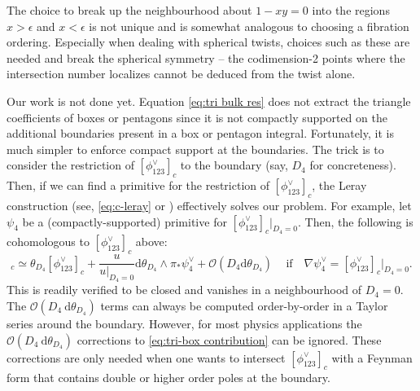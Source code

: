 \documentclass[11pt]{article}
\renewcommand{\d}{\text{d}}
\newcommand{\be}{\begin{equation}}
\newcommand{\ee}{\end{equation}}
\renewcommand{\O}{\mathcal{O}}
\begin{document}
The choice to break up the neighbourhood about $1-xy = 0$ into the regions $x>\epsilon$ and $x<\epsilon$ is not unique and is somewhat analogous to choosing a fibration ordering. Especially when dealing with spherical twists, choices such as these are needed and break the spherical symmetry -- the codimension-2 points where the intersection number localizes cannot be deduced from the twist alone.

Our work is not done yet. Equation \eqref{eq:tri bulk res} does not extract the triangle coefficients of boxes or pentagons since it is not compactly supported on the additional boundaries present in a box or pentagon integral.
Fortunately, it is much simpler to enforce compact support at the boundaries. The trick is to consider the restriction of $[\phi^\vee_{123}]_c$ to the boundary (say, $D_4$ for concreteness). 
Then, if we can find a primitive for the restriction of $[\phi^\vee_{123}]_c$, the Leray construction (see, \eqref{eq:c-leray} or \cite{Caron-Huot:2021xqj}) effectively solves our problem. For example, let $\psi_4$ be a (compactly-supported) primitive for $[\phi^\vee_{123}]_c\vert_{D_4=0}$.
Then, the following is cohomologous to $[\phi^\vee_{123}]_c$ above:
\be
	[\phi^\vee_{123}]_c 
	\simeq \theta_{D_4}[\phi^\vee_{123}]_c + \frac{u}{u\vert_{D_4=0}}
 	\d\theta_{D_4} \wedge \pi_*\psi_4^\vee + \O(D_4 \d\theta_{D_4})\,
 	\quad\mbox{if}\quad 
 	\nabla \psi_4^\vee = [\phi^\vee_{123}]_c\vert_{D_4=0}.
\label{eq:tri-box contribution}
\ee
This is readily verified to be closed and vanishes in a neighbourhood of $D_4=0$.
The $\O(D_4\ \d\theta_{D_4})$ terms can always be computed order-by-order in a Taylor series around the boundary.
However, for most physics applications the $\O(D_4\ \d\theta_{D_4})$ corrections to \eqref{eq:tri-box contribution} can be ignored. These corrections are only needed when one wants to intersect $[\phi^\vee_{123}]_c$ with a Feynman form that contains double or higher order poles at the boundary. 
\end{document}
